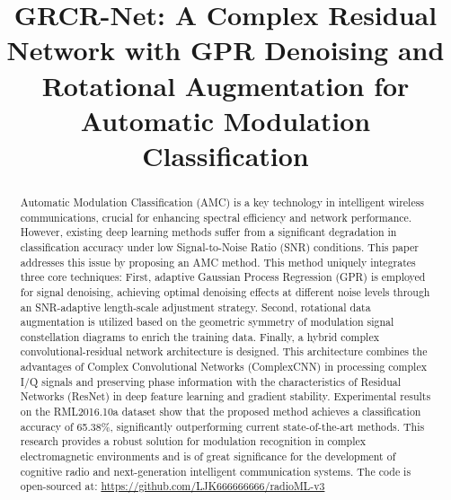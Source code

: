 \documentclass[conference]{IEEEtran}
\begin{document}
\sloppy

\title{GRCR-Net: A Complex Residual Network with GPR Denoising and Rotational Augmentation for Automatic Modulation Classification}

\author{
}

\maketitle

\begin{abstract}
Automatic Modulation Classification (AMC) is a key technology in intelligent wireless communications, crucial for enhancing spectral efficiency and network performance.
However, existing deep learning methods suffer from a significant degradation in classification accuracy under low Signal-to-Noise Ratio (SNR) conditions.
This paper addresses this issue by proposing an AMC method.
This method uniquely integrates three core techniques:
First, adaptive Gaussian Process Regression (GPR) is employed for signal denoising, achieving optimal denoising effects at different noise levels through an SNR-adaptive length-scale adjustment strategy.
Second, rotational data augmentation is utilized based on the geometric symmetry of modulation signal constellation diagrams to enrich the training data.
Finally, a hybrid complex convolutional-residual network architecture is designed.
This architecture combines the advantages of Complex Convolutional Networks (ComplexCNN) in processing complex I/Q signals and preserving phase information with the characteristics of Residual Networks (ResNet) in deep feature learning and gradient stability.
Experimental results on the RML2016.10a dataset show that the proposed method achieves a classification accuracy of 65.38\%, significantly outperforming current state-of-the-art methods.
This research provides a robust solution for modulation recognition in complex electromagnetic environments and is of great significance for the development of cognitive radio and next-generation intelligent communication systems.
The code is open-sourced at: \url{https://github.com/LJK666666666/radioML-v3}
\end{abstract}
\end{document}
